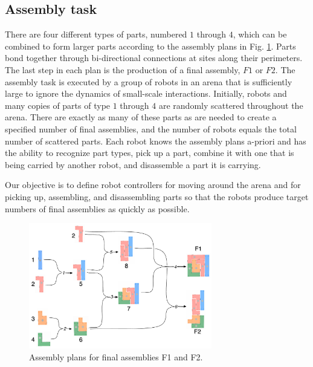 \subsection{Assembly task} %
\label{sub:assembly_task}

There are four different types of parts, numbered $1$ through $4$,
which can be combined to form larger parts according to the assembly
plans in Fig. \ref{fig:assembly_plans}. Parts bond together through
bi-directional connections at sites along their perimeters. The last
step in each plan is the production of a final assembly, $F1$ or
$F2$.  The assembly task is executed by a group of robots in an
arena that is sufficiently large to ignore the dynamics of
small-scale interactions.  Initially, robots and many copies of
parts of type $1$ through $4$ are randomly scattered throughout the
arena. There are exactly as many of these parts as are needed to
create a specified number of final assemblies, and the number of
robots equals the total number of scattered parts. Each robot knows
the assembly plans a-priori and has the ability to recognize part
types, pick up a part, combine it with one that is being carried by
another robot, and disassemble a part it is carrying.

Our objective is to define robot controllers for moving around the
arena and for picking up, assembling, and disassembling parts so
that the robots produce target numbers of final assemblies as
quickly as possible.

\begin{figure}[t]
    \centering
        \includegraphics[width=8cm]{img/assembly_plans.pdf}
    \caption{Assembly plans for final assemblies F1 and F2.}
    \label{fig:assembly_plans}
\end{figure}



